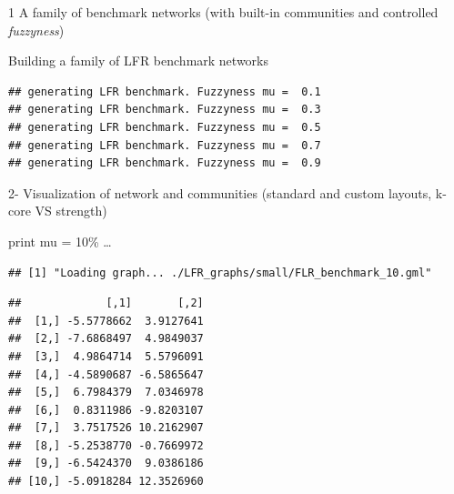\documentclass[
  ignorenonframetext,
]{beamer}
\begin{document}
\begin{frame}[fragile]{1 A family of benchmark networks (with built-in
communities and controlled \emph{fuzzyness})}
\begin{block}{Building a family of LFR benchmark networks}
\begin{verbatim}
## generating LFR benchmark. Fuzzyness mu =  0.1
## generating LFR benchmark. Fuzzyness mu =  0.3
## generating LFR benchmark. Fuzzyness mu =  0.5
## generating LFR benchmark. Fuzzyness mu =  0.7
## generating LFR benchmark. Fuzzyness mu =  0.9
\end{verbatim}
\end{block}
\end{frame}

\begin{frame}[fragile]{2- Visualization of network and communities
(standard and custom layouts, k-core VS strength)}
\protect\hypertarget{visualization-of-network-and-communities-standard-and-custom-layouts-k-core-vs-strength}{}
\begin{block}{print mu = 10\%}
\protect\hypertarget{print-mu-10}{}
\ldots{}

\begin{verbatim}
## [1] "Loading graph... ./LFR_graphs/small/FLR_benchmark_10.gml"
\end{verbatim}

\begin{verbatim}
##             [,1]       [,2]
##  [1,] -5.5778662  3.9127641
##  [2,] -7.6868497  4.9849037
##  [3,]  4.9864714  5.5796091
##  [4,] -4.5890687 -6.5865647
##  [5,]  6.7984379  7.0346978
##  [6,]  0.8311986 -9.8203107
##  [7,]  3.7517526 10.2162907
##  [8,] -5.2538770 -0.7669972
##  [9,] -6.5424370  9.0386186
## [10,] -5.0918284 12.3526960
\end{verbatim}
\end{block}


\end{frame}
\end{document}
